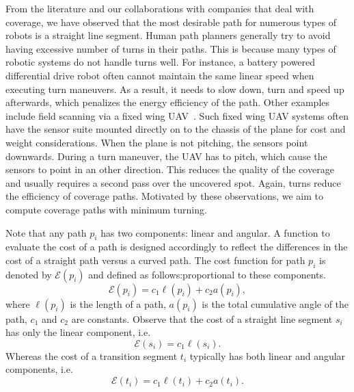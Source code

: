 \documentclass[../main.tex]{subfiles}
\begin{document}
From the literature and our collaborations with companies that deal with coverage, we have observed that the most desirable path for numerous types of robots is a straight line segment. Human path planners generally try to avoid having excessive number of turns in their paths. This is because many types of robotic systems do not handle turns well. For instance, a battery powered differential drive robot often cannot maintain the same linear speed when executing turn maneuvers. As a result, it needs to slow down, turn and speed up afterwards, which penalizes the energy efficiency of the path. Other examples include field scanning via a fixed wing UAV~\cite{frew2004vision}. Such fixed wing UAV systems often have the sensor suite mounted directly on to the chassis of the plane for cost and weight considerations. When the plane is not pitching, the sensors point downwards. During a turn maneuver, the UAV has to pitch, which cause the sensors to point in an other direction. This reduces the quality of the coverage and usually requires a second pass over the uncovered spot. Again, turns reduce the efficiency of coverage paths. Motivated by these observations, we aim to compute coverage paths with minimum turning. %

Note that any path $p_i$ has two components: linear and angular. A function to evaluate the cost of a path is designed accordingly to reflect the differences in the cost of a straight path versus a curved path. The cost function for path $p_i$ is denoted by $\mathcal{E}(p_i)$ and defined as follows:proportional to these components.
\begin{equation}
	\mathcal{E}(p_i)=c_1\ell(p_i)+c_2a(p_i),
\end{equation}
where $\ell(p_i)$ is the length of a path, $a(p_i)$ is the total cumulative angle of the path, $c_1$ and $c_2$ are constants. Observe that the cost of a straight line segment $s_i$ has only the linear component, i.e.
\begin{equation}
	\mathcal{E}(s_i)=c_1\ell(s_i).
\end{equation}
Whereas the cost of a transition segment $t_i$ typically has both linear and angular components, i.e.
\begin{equation}
	\mathcal{E}(t_i)=c_1\ell(t_i)+c_2a(t_i).
\end{equation}
\end{document}
